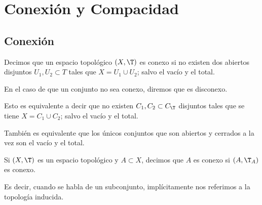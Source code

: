 \chapter{Conexión y Compacidad}

\section{Conexión}

\begin{definicion}[Conexión]
    Decimos que un espacio topológico $(X,\T)$ es conexo si no existen dos abiertos disjuntos $U_1,U_2\subset T$ tales que $X=U_1\cup U_2$; salvo el vacío y el total.

    En el caso de que un conjunto no sea conexo, diremos que es disconexo.
\end{definicion}

Esto es equivalente a decir que no existen $C_1,C_2\subset C_\T$ disjuntos tales que se tiene $X=C_1\cup C_2$; salvo el vacío y el total.

También es equivalente que los únicos conjuntos que son abiertos y cerrados a la vez son el vacío y el total.

\begin{observacion}
    Si $(X,\T)$ es un espacio topológico y $A\subset X$, decimos que $A$ es conexo si $(A,\T_A)$ es conexo.

    Es decir, cuando se habla de un subconjunto, implícitamente nos referimos a la topología inducida.
\end{observacion}

